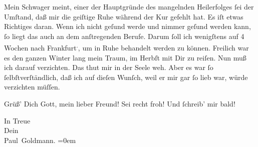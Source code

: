 \pstart
           {\pb}Mein Schwager meint, einer der Hauptgründe des mangelnden
               Heilerfolges{ }ſei der Umſtand, daß mir die geiſtige Ruhe während der Kur gefehlt hat.
               Es iſt etwas Richtiges daran. Wenn ich nicht geſund werde und nimmer geſund werden
               kann,{ }ſo liegt das auch an dem anſtregenden Berufe. Darum{ }ſoll ich wenigſtens auf 4
               Wochen nach Frankfurt\substVorne{}\textsuperscript{.}\substDazwischen{},\substHinten{} um in Ruhe behandelt werden zu können. Freilich war es den ganzen Winter
               lang mein Traum, im Herbſt mit Dir zu reiſen. Nun muß ich darauf verzichten. Das thut
               mir in der Seele {\pb}weh. Aber es war{ }ſo{ }ſelbſtverſtändlich, daß ich auf dieſen Wunſch, weil er mir gar{ }ſo lieb war, würde
               verzichten müſſen.\pend
           
\pstart
           Grüß’ Dich Gott, mein lieber Freund! Sei recht froh! Und{ }ſchreib’ mir bald!\pend
           
\pstart
           In Treue {\\[\baselineskip]}Dein {\\[\baselineskip]}\spacefill\mbox{Paul Goldmann.}\pend
           \leftskip=0em{}\endnumbering{}  \newcommand{\dateiname}{L02617}\newcommand{\titel}{Paul Goldmann an Arthur Schnitzler, 21. 4. [1894]}\newcommand{\editorInnen}{Martin Anton Müller und Laura Untner}
